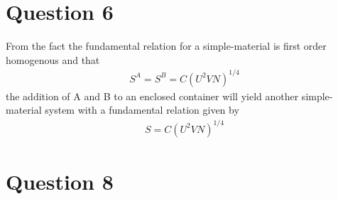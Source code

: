 \documentclass{article}
\numberwithin{equation}{section}
\begin{document}
\large
\section*{Question 6}

From the fact the fundamental relation for a simple-material is first order homogenous and that 
\begin{align*}
S^A=S^B=C(U^2VN)^{1/4}
\end{align*} 
the addition of A and B to an enclosed container will yield another simple-material system with a fundamental relation given by
\begin{align*}
S=C(U^2VN)^{1/4}
\end{align*}

\section*{Question 8}
\end{document}

